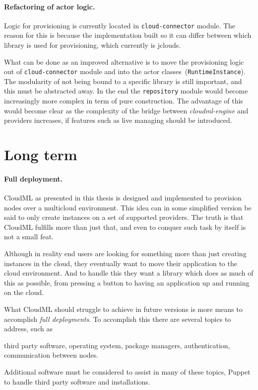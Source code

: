 \paragraph{Refactoring of actor logic.}

Logic for provisioning is currently located in \texttt{cloud-connector} module.
The reason for this is because the implementation built so it can differ between which library is used for provisioning, 
which currently is jclouds.

What can be done as an improved alternative is to move the provisioning logic out of \texttt{cloud-connector} 
module and into the actor classes~(\texttt{RuntimeInstance}).
The modularity of not being bound to a specific library is still important, and this must be abstracted away.
In the end the \texttt{repository} module would become increasingly more complex in term of pure construction.
The advantage of this would become clear as the complexity of the bridge between \emph{cloudml-engine}
and providers increases, \eg if features such as live managing should be introduced.

\section{Long term}

\paragraph{Full deployment.}

CloudML as presented in this thesis is designed and implemented to provision nodes over a multicloud environment.
This idea can in some simplified version be said to only create instances on a set of supported providers.
The truth is that CloudML fulfills more than just that, and even to conquer such task by itself is not a small feat.

Although in reality end users are looking for something more than just creating instances in the cloud,
they eventually want to move their application to the cloud environment.
And to handle this they want a library which does as much of this as possible,
from pressing a button to having an application up and running on the cloud.

What CloudML should struggle to achieve in future versions is more means to accomplish \emph{full deployments}.
To accomplish this there are several topics to address, such as
\begin{ii}
  \iitem third party software,
  \iitem operating system,
  \iitem package managers,
  \iitem authentication,
  \iitem communication between nodes.
\end{ii}
Additional software must be considered to assist in many of these topics,
\eg Puppet to handle third party software and installations.

